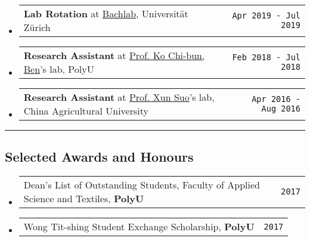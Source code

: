 \documentclass[10pt,a4paper]{article}
\makeatletter
\newcommand{\headerrow}[2]
{\begin{tabular*}{\linewidth}{l@{\extracolsep{\fill}}r}
	#1 &
	#2 \\
\end{tabular*}}
\newcommand{\urlKo}{https://www.polyu.edu.hk/en/abct/people/academic-staff/dr-ko-cb-ben/}
\newcommand{\urlSuo}{https://cvm.cau.edu.cn/art/2017/9/8/art_41955_48.html}
\newcommand{\Bachlab}{\href{http://bachlab.org/}{Bachlab}}
\newcommand{\CongiBench}{\href{https://github.com/fmelinscak/cognibench}{CongiBench}}
\newcommand{\SciUnit}{\href{https://github.com/scidash/sciunit}{SciUnit}}
\makeatother
\begin{document}
\begin{itemize}
	\item
	      \headerrow
	      {\textbf{Lab Rotation} at \Bachlab, Universität Zürich}
	      {\texttt{Apr 2019 - Jul 2019}}

	\item
	      \headerrow
	      {\textbf{Research Assistant} at \href{\urlKo}{Prof. Ko Chi-bun, Ben}'s lab, PolyU}
	      {\texttt{Feb 2018 - Jul 2018}}

	\item
	      \headerrow
	      {\textbf{Research Assistant} at \href{\urlSuo}{Prof. Xun Suo}'s lab,
		      China Agricultural University}
	      {\texttt{Apr 2016 - Aug 2016}}

\end{itemize}



\hrule
\vspace{-1em}
\subsection*{Selected Awards and Honours}

\begin{itemize}
	\parskip=0.1em
	\item
	      \headerrow
	      {Dean’s List of Outstanding Students, Faculty of Applied Science and
		      Textiles, \textbf{PolyU}}
	      {\texttt{{2017}}}


	\item
	      \headerrow
	      {Wong Tit-shing Student Exchange Scholarship, \textbf{PolyU}}
	      {\texttt{{2017}}}

\end{itemize}
\end{document}
